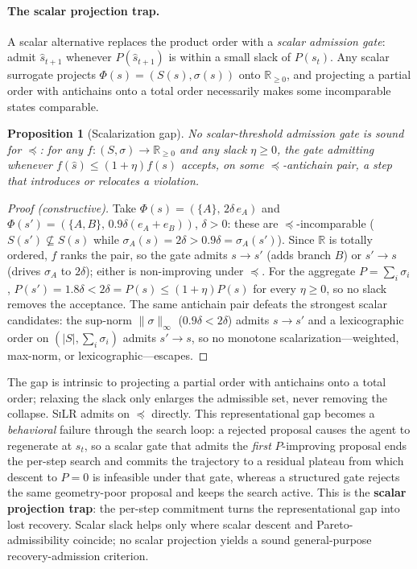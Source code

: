 \documentclass[letterpaper]{article} %
\theoremstyle{plain}
\newtheorem{proposition}{Proposition}
\newcommand{\silr}{\textsc{SiLR}}
\begin{document}
\paragraph{The scalar projection trap.}
A scalar alternative replaces the product order with a \emph{scalar admission gate}: admit $\hat{s}_{t+1}$ whenever $P(\hat{s}_{t+1})$ is within a small slack of $P(s_t)$. Any scalar surrogate projects $\Phi(s)=(S(s),\sigma(s))$ onto $\mathbb{R}_{\ge 0}$, and projecting a partial order with antichains onto a total order necessarily makes some incomparable states comparable.
\begin{proposition}[Scalarization gap]
\label{prop:gap}
No scalar-threshold admission gate is sound for $\preceq$: for any $f:(S,\sigma)\to\mathbb{R}_{\ge 0}$ and any slack $\eta\ge0$, the gate admitting whenever $f(\hat{s})\le(1{+}\eta)f(s)$ accepts, on some $\preceq$-antichain pair, a step that introduces or relocates a violation.
\end{proposition}
\begin{proof}[Proof (constructive)]
Take $\Phi(s)=(\{A\},\,2\delta\,e_A)$ and $\Phi(s')=(\{A,B\},\,0.9\delta(e_A{+}e_B))$, $\delta>0$: these are $\preceq$-incomparable ($S(s')\not\subseteq S(s)$ while $\sigma_A(s)=2\delta>0.9\delta=\sigma_A(s')$). Since $\mathbb{R}$ is totally ordered, $f$ ranks the pair, so the gate admits $s\!\to\!s'$ (adds branch $B$) or $s'\!\to\!s$ (drives $\sigma_A$ to $2\delta$); either is non-improving under $\preceq$. For the aggregate $P=\sum_i\sigma_i$, $P(s')=1.8\delta<2\delta=P(s)\le(1{+}\eta)P(s)$ for every $\eta\ge0$, so no slack removes the acceptance. The same antichain pair defeats the strongest scalar candidates: the sup-norm $\|\sigma\|_\infty$ ($0.9\delta<2\delta$) admits $s\!\to\!s'$ and a lexicographic order on $(|S|,\sum_i\sigma_i)$ admits $s'\!\to\!s$, so no monotone scalarization---weighted, max-norm, or lexicographic---escapes.
\end{proof}
\noindent The gap is intrinsic to projecting a partial order with antichains onto a total order; relaxing the slack only enlarges the admissible set, never removing the collapse. \silr{} admits on $\preceq$ directly. This representational gap becomes a \emph{behavioral} failure through the search loop: a rejected proposal causes the agent to regenerate at $s_t$, so a scalar gate that admits the \emph{first} $P$-improving proposal ends the per-step search and commits the trajectory to a residual plateau from which descent to $P=0$ is infeasible under that gate, whereas a structured gate rejects the same geometry-poor proposal and keeps the search active. This is the \textbf{scalar projection trap}: the per-step commitment turns the representational gap into lost recovery. Scalar slack helps only where scalar descent and Pareto-admissibility coincide; no scalar projection yields a sound general-purpose recovery-admission criterion.
\end{document}
